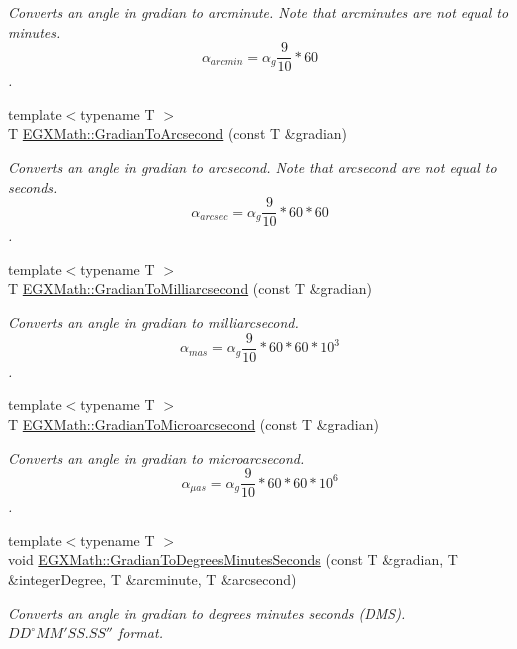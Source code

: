 \begin{DoxyCompactItemize}
\begin{DoxyCompactList}\small\item\em Converts an angle in gradian to arcminute. Note that arcminutes are not equal to minutes. \[\alpha_{arcmin}=\alpha_{g}\frac{9}{10} * 60\]. \end{DoxyCompactList}\item 
{\footnotesize template$<$typename T $>$ }\\T \mbox{\hyperlink{group___e_g_x_math-_angle_conversions-_gradian_gac768fd444195264165d332f2f5e84d92}{E\+G\+X\+Math\+::\+Gradian\+To\+Arcsecond}} (const T \&gradian)
\begin{DoxyCompactList}\small\item\em Converts an angle in gradian to arcsecond. Note that arcsecond are not equal to seconds. \[\alpha_{arcsec}=\alpha_{g}\frac{9}{10} * 60 * 60\]. \end{DoxyCompactList}\item 
{\footnotesize template$<$typename T $>$ }\\T \mbox{\hyperlink{group___e_g_x_math-_angle_conversions-_gradian_gad77ea0956413029f4166dce8d7f5ce83}{E\+G\+X\+Math\+::\+Gradian\+To\+Milliarcsecond}} (const T \&gradian)
\begin{DoxyCompactList}\small\item\em Converts an angle in gradian to milliarcsecond. \[\alpha_{mas}=\alpha_{g}\frac{9}{10} * 60 * 60 * 10^3\]. \end{DoxyCompactList}\item 
{\footnotesize template$<$typename T $>$ }\\T \mbox{\hyperlink{group___e_g_x_math-_angle_conversions-_gradian_gab7781c860ea3ab9c9cf76ab639846a07}{E\+G\+X\+Math\+::\+Gradian\+To\+Microarcsecond}} (const T \&gradian)
\begin{DoxyCompactList}\small\item\em Converts an angle in gradian to microarcsecond. \[\alpha_{\mu as}=\alpha_{g}\frac{9}{10} * 60 * 60 * 10^6\]. \end{DoxyCompactList}\item 
{\footnotesize template$<$typename T $>$ }\\void \mbox{\hyperlink{group___e_g_x_math-_angle_conversions-_gradian_ga5c81967ddb8f677634d161713174e419}{E\+G\+X\+Math\+::\+Gradian\+To\+Degrees\+Minutes\+Seconds}} (const T \&gradian, T \&integer\+Degree, T \&arcminute, T \&arcsecond)
\begin{DoxyCompactList}\small\item\em Converts an angle in gradian to degrees minutes seconds (D\+MS). ${DD}^{\circ}{MM}'{SS.SS}''$ format. \end{DoxyCompactList}\item 

\end{DoxyCompactItemize}
